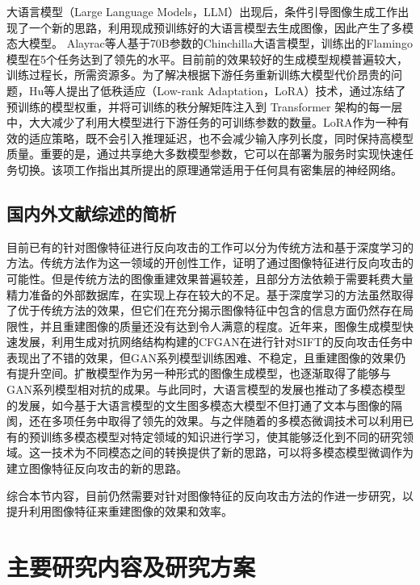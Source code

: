 \par
大语言模型（Large Language Models，LLM）出现后，条件引导图像生成工作出现了一个新的思路，利用现成预训练好的大语言模型去生成图像，因此产生了多模态大模型\cite{zhang2024mmllmsrecentadvancesmultimodal}。
Alayrac\cite{NEURIPS2022_960a172b}等人基于70B参数的Chinchilla大语言模型，训练出的Flamingo模型在5个任务达到了领先的水平。目前前的效果较好的生成模型规模普遍较大，训练过程长，所需资源多。为了解决根据下游任务重新训练大模型代价昂贵的问题，Hu\cite{hu2021loralowrankadaptationlarge}等人提出了低秩适应（Low-rank Adaptation，LoRA）技术，通过冻结了预训练的模型权重，并将可训练的秩分解矩阵注入到 Transformer 架构的每一层中，大大减少了利用大模型进行下游任务的可训练参数的数量。LoRA作为一种有效的适应策略，既不会引入推理延迟，也不会减少输入序列长度，同时保持高模型质量。重要的是，通过共享绝大多数模型参数，它可以在部署为服务时实现快速任务切换。该项工作指出其所提出的原理通常适用于任何具有密集层的神经网络。

\subsection{国内外文献综述的简析}
目前已有的针对图像特征进行反向攻击的工作可以分为传统方法和基于深度学习的方法。传统方法作为这一领域的开创性工作，证明了通过图像特征进行反向攻击的可能性。但是传统方法的图像重建效果普遍较差，且部分方法依赖于需要耗费大量精力准备的外部数据库，在实现上存在较大的不足。基于深度学习的方法虽然取得了优于传统方法的效果，但它们在充分揭示图像特征中包含的信息方面仍然存在局限性，并且重建图像的质量还没有达到令人满意的程度。近年来，图像生成模型快速发展，利用生成对抗网络结构构建的CFGAN在进行针对SIFT的反向攻击任务中表现出了不错的效果，但GAN系列模型训练困难、不稳定，且重建图像的效果仍有提升空间。扩散模型作为另一种形式的图像生成模型，也逐渐取得了能够与GAN系列模型相对抗的成果。与此同时，大语言模型的发展也推动了多模态模型的发展，如今基于大语言模型的文生图多模态大模型不但打通了文本与图像的隔阂，还在多项任务中取得了领先的效果。与之伴随着的多模态微调技术可以利用已有的预训练多模态模型对特定领域的知识进行学习，使其能够泛化到不同的研究领域。这一技术为不同模态之间的转换提供了新的思路，可以将多模态模型微调作为建立图像特征反向攻击的新的思路。
\par
综合本节内容，目前仍然需要对针对图像特征的反向攻击方法的作进一步研究，以提升利用图像特征来重建图像的效果和效率。
\section{主要研究内容及研究方案}
